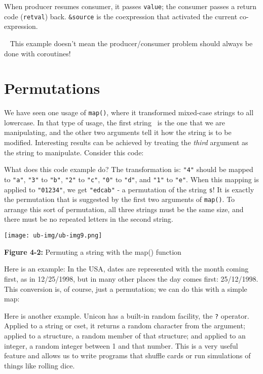 When producer resumes consumer, it passes \texttt{value}; the consumer
passes a return code (\texttt{retval}) back. \texttt{\&source} is the
coexpression that activated the current co-expression.

\medskip{}\ {\sffamily
This example doesn't mean the producer/consumer problem
should always be done with coroutines!}\medskip

\section{Permutations}

We have seen one usage of
\texttt{map()}, where it transformed mixed-case strings to
all lowercase. In that type of usage, the first string \ is the one
that we are manipulating, and the other two arguments tell it how the
string is to be modified. Interesting results can be achieved by
treating the \textit{third} argument as the string to manipulate.
Consider this code:


What does this code example do? The transformation is:
\texttt{"4"} should be mapped to
\texttt{"a"},
\texttt{"3"} to
\texttt{"b"},
\texttt{"2"} to
\texttt{"c"},
\texttt{"0"} to
\texttt{"d"}, and
\texttt{"1"} to
\texttt{"e"}. When this mapping is applied
to \texttt{"01234"}, we get
\texttt{"edcab"} - a permutation of the
string \texttt{s}! It is exactly the permutation that is suggested by
the first two arguments of \texttt{map()}. To arrange this sort of
permutation, all three strings must be the same size, and there must be
no repeated letters in the second string.


\begin{center}
\texttt{[image: ub-img/ub-img9.png]}
\end{center}
{\sffamily\bfseries Figure 4-2:}
{\sffamily Permuting a string with the map() function}

\bigskip

Here is an example: In the USA, dates are represented with the month
coming first, as in 12/25/1998, but in many other places the day comes
first: 25/12/1998. This conversion is, of course, just a permutation;
we can do this with a simple map:


Here is another example. Unicon has a built-in random facility, the
\texttt{?} operator. Applied to a string or cset, it returns a random
character from the argument; applied to a structure, a random member of
that structure; and applied to an integer, a random integer between 1
and that number. This is a very useful feature and allows us to write
programs that shuffle cards or run simulations of things like rolling
dice.

